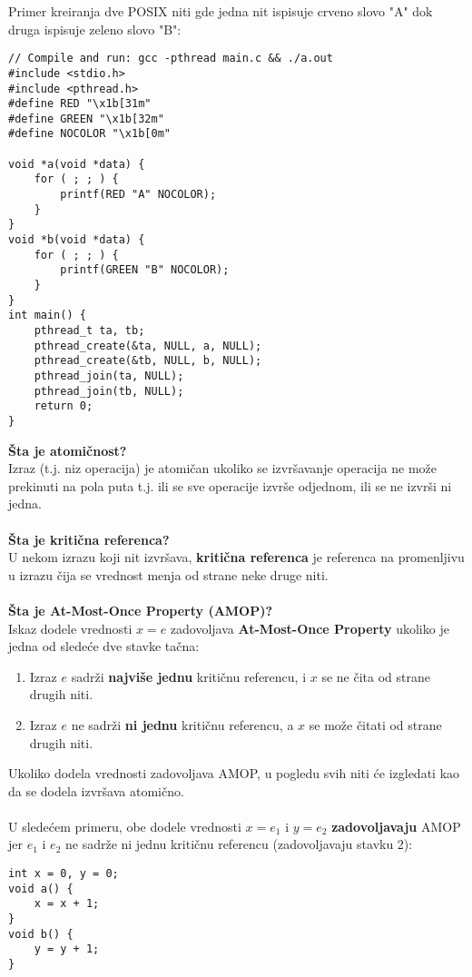 Primer kreiranja dve POSIX niti gde jedna nit ispisuje crveno slovo "{\color{red}A}" dok druga ispisuje zeleno slovo "{\color{OliveGreen}B}":
\begin{lstlisting}
// Compile and run: gcc -pthread main.c && ./a.out
#include <stdio.h>
#include <pthread.h>
#define RED "\x1b[31m"
#define GREEN "\x1b[32m"
#define NOCOLOR "\x1b[0m"

void *a(void *data) {
	for ( ; ; ) {
		printf(RED "A" NOCOLOR);
	}
}
void *b(void *data) {
	for ( ; ; ) {
		printf(GREEN "B" NOCOLOR);
	}
}
int main() {
	pthread_t ta, tb;
	pthread_create(&ta, NULL, a, NULL);
	pthread_create(&tb, NULL, b, NULL);	
	pthread_join(ta, NULL);
	pthread_join(tb, NULL);
	return 0;
}
\end{lstlisting}
\textbf{\v{S}ta je atomi\v{c}nost?}\\
Izraz (t.j. niz operacija) je atomi\v{c}an ukoliko se izvr\v{s}avanje operacija ne mo\v{z}e prekinuti na pola puta t.j. ili se sve operacije izvr\v{s}e odjednom, ili se ne izvr\v{s}i ni jedna.
\\\\
\textbf{\v{S}ta je kriti\v{c}na referenca?}\\
U nekom izrazu koji nit izvr\v{s}ava, \textbf{kriti\v{c}na referenca} je referenca na promenljivu u izrazu \v{c}ija se vrednost menja od strane neke druge niti.
\\\\
\textbf{\v{S}ta je At-Most-Once Property (AMOP)?}\\
Iskaz dodele vrednosti $x=e$ zadovoljava \textbf{At-Most-Once Property} ukoliko je jedna od slede\'{c}e dve stavke ta\v{c}na:
\begin{enumerate}
    \item Izraz $e$ sadr\v{z}i \textbf{najvi\v{s}e jednu} kriti\v{c}nu referencu, i $x$ se ne \v{c}ita od strane drugih niti.
    \item Izraz $e$ ne sadr\v{z}i \textbf{ni jednu} kriti\v{c}nu referencu, a $x$ se mo\v{z}e \v{c}itati od strane drugih niti. 
\end{enumerate}
Ukoliko dodela vrednosti zadovoljava AMOP, u pogledu svih niti \'{c}e izgledati kao da se dodela izvr\v{s}ava atomi\v{c}no.
\\\\
U slede\'{c}em primeru, obe dodele vrednosti $x=e_1$ i $y=e_2$ \textbf{zadovoljavaju} AMOP jer $e_1$ i $e_2$ ne sadr\v{z}e ni jednu kriti\v{c}nu referencu (zadovoljavaju stavku 2):
\begin{lstlisting}
int x = 0, y = 0;
void a() {
    x = x + 1;
}
void b() {
    y = y + 1;
}
\end{lstlisting}
